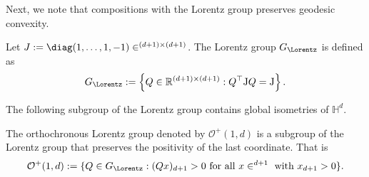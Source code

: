 \documentclass[twoside,11pt]{article}
\begin{document}
Next, we note that compositions with the Lorentz group preserves geodesic convexity.


\begin{definition}
Let $J := \diag(1, \ldots, 1, -1) \in \real^{(d+1) \times (d+1)}$. The Lorentz group $G_\Lorentz$ is defined as 
\[
G_{\Lorentz}:=\left\{Q \in \mathbb{R}^{(d+1) \times(d+1)}: Q^{\top} \mathrm{J} Q=\mathrm{J}\right\} .
\]
\end{definition}


The following subgroup of the Lorentz group contains global isometries of $\mathbb{H}^d$.

\begin{definition}
The orthochronous Lorentz group denoted by $\mathcal{O}^+(1,d)$ is a subgroup of the Lorentz group that preserves the positivity of the last coordinate. That is 
\[
\mathcal{O}^+(1,d) := \{Q \in G_\Lorentz: (Qx)_{d+1} > 0 \text{ for all } x \in \real^{d+1} \text{ with } x_{d+1} > 0\}.
\]
\end{definition}
\end{document}
